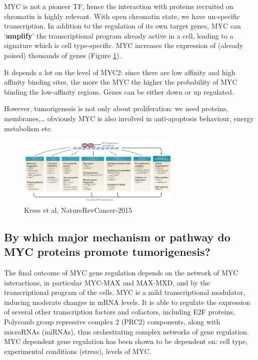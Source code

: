 MYC is not a pioneer TF, hence the interaction with proteins recruited on chromatin is highly relevant.
With open chromatin state, we have un-specific transcription. In addition to the regulation of its own target genes, MYC can `\textbf{amplify}' the transcriptional program already active in a cell, leading to a signature which is cell type-specific. MYC increases the expression of (already poised) thousands of genes (Figure \ref{fig:ppmyc}).

It depends a lot on the level of MYC2: since there are low affinity and high affinity binding sites, the more the MYC the higher the probability of MYC binding the low-affinity regions. Genes can be either down or up regulated.

However, tumorigenesis is not only about proliferation: we need proteins, membranes,\ldots{} obviously MYC is also involved in anti-apoptosis behaviour, energy metabolism etc.

\begin{figure}
\centering
\includegraphics[width=0.7\textwidth]{../_resources/cdb9692b7dd2ca7bcfae696cd1b1ce36.png}
\caption{Kress et al, NatureRevCancer-2015}
\label{fig:ppmyc}
\end{figure}

\hypertarget{by-which-major-mechanism-or-pathway-myc-proteins-promote-tumorigenesis}{%
\subsection{By which major mechanism or pathway do MYC proteins promote tumorigenesis?}\label{by-which-major-mechanism-or-pathway-myc-proteins-promote-tumorigenesis}}

The final outcome of MYC gene regulation depends on the network of MYC interactions, in particular MYC-MAX
and MAX-MXD, and by the transcriptional program of the cells.
MYC is a mild transcriptional modulator, inducing moderate changes in mRNA levels.
It is able to regulate the expression of several other transcription factors and cofactors, including E2F proteins,
Polycomb group repressive complex 2 (PRC2) components, along with microRNAs (miRNAs), thus orchestrating
complex networks of gene regulation.
MYC dependent gene regulation has been shown to be dependent on: cell type, experimental conditions (stress),
levels of MYC.

